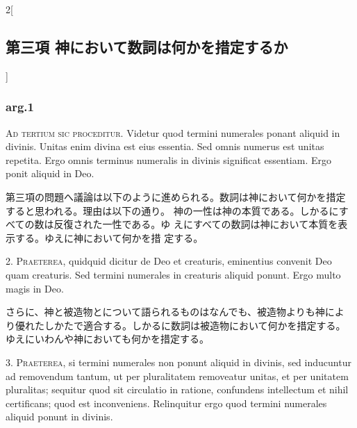 \documentclass[paper=a4paper,fontsize=10pt,jafontsize=9pt,titlepage]{jlreq}
\begin{document}
\begin{paracol}{2}[\subsection{第三項 神において数詞は何かを措定するか}]

\subsubsection{arg.1}

{\scshape Ad tertium sic proceditur}. Videtur quod termini numerales ponant
aliquid in divinis. Unitas enim divina est eius essentia. Sed omnis
numerus est unitas repetita. Ergo omnis terminus numeralis in divinis
significat essentiam. Ergo ponit aliquid in Deo.


\switchcolumn


第三項の問題へ議論は以下のように進められる。数詞は神において何かを措定
 すると思われる。理由は以下の通り。
神の一性は神の本質である。しかるにすべての数は反復された一性である。ゆ
 えにすべての数詞は神において本質を表示する。ゆえに神において何かを措
 定する。




2. {\scshape Praeterea}, quidquid dicitur de Deo et creaturis, eminentius convenit
Deo quam creaturis. Sed termini numerales in creaturis aliquid
ponunt. Ergo multo magis in Deo.


\switchcolumn


さらに、神と被造物とについて語られるものはなんでも、被造物よりも神によ
 り優れたしかたで適合する。しかるに数詞は被造物において何かを措定する。
 ゆえにいわんや神においても何かを措定する。




3. {\scshape Praeterea}, si termini numerales non ponunt aliquid in divinis, sed
inducuntur ad removendum tantum, ut per pluralitatem removeatur
unitas, et per unitatem pluralitas; sequitur quod sit circulatio in
ratione, confundens intellectum et nihil certificans; quod est
inconveniens. Relinquitur ergo quod termini numerales aliquid ponunt
in divinis.


\switchcolumn



\end{paracol}
\end{document}
